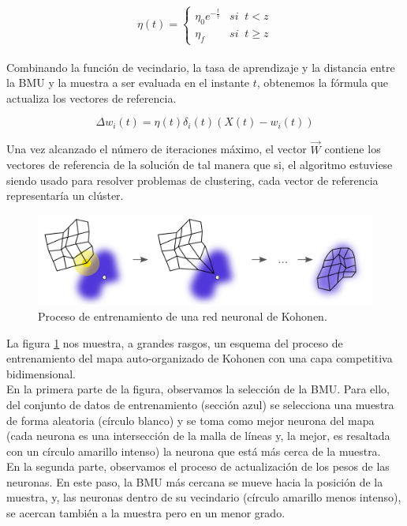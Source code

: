 $$\eta(t) = \left\{
\begin{array}{ll}
\eta_0e^{-\frac{t}{\tau}} & si \;\;t < z\\
\eta_f & si  \;\; t\geq z
\end{array}
\right.$$\\

Combinando la función de vecindario, la tasa de aprendizaje y la distancia entre la BMU y la muestra a ser evaluada en el instante $t$, obtenemos la fórmula que actualiza los vectores de referencia.

$$\Delta{w_i(t)}=\eta(t)\delta_i(t)(X(t)-w_i(t))$$


Una vez alcanzado el número de iteraciones máximo, el vector $\vec{W}$ contiene los vectores de referencia de la solución de tal manera que si, el algoritmo estuviese siendo usado para resolver problemas de clustering, cada vector de referencia representaría un clúster.

\begin{figure}[H]
\centering
\includegraphics[width=1.0\textwidth]{imagenes/somtraining.png}
\caption{Proceso de entrenamiento de una red neuronal de Kohonen.}
\label{img:somtraining}
\end{figure}

La figura \ref{img:somtraining} nos muestra, a grandes rasgos, un esquema del proceso de entrenamiento del mapa auto-organizado de Kohonen con una capa competitiva bidimensional.\\

En la primera parte de la figura, observamos la selección de la BMU. Para ello, del conjunto de datos de entrenamiento (sección azul) se selecciona una muestra de forma aleatoria (círculo blanco) y se toma como mejor neurona del mapa (cada neurona es una intersección de la malla de líneas y, la mejor, es resaltada con un círculo amarillo intenso) la neurona que está más cerca de la muestra.\\

En la segunda parte, observamos el proceso de actualización de los pesos de las neuronas. En este paso, la BMU más cercana se mueve hacia la posición de la muestra, y, las neuronas dentro de su vecindario (círculo amarillo menos intenso), se acercan también a la muestra pero en un menor grado.\\

